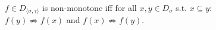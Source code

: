 %
$f\in D_{\langle\sigma,\tau\rangle}$ is non-monotone iff for all $x,y\in D_\sigma$ s.t. $x\subseteq y$:\\$f(y)\not\Rightarrow f(x)$ and $f(x)\not\Rightarrow f(y)$.%
